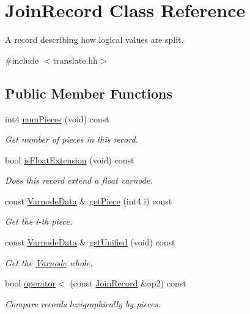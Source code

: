 \hypertarget{class_join_record}{}\section{Join\+Record Class Reference}
\label{class_join_record}


A record describing how logical values are split.  




{\ttfamily \#include $<$translate.\+hh$>$}

\subsection*{Public Member Functions}
\begin{DoxyCompactItemize}
\item 
int4 \mbox{\hyperlink{class_join_record_a18d9eb13c87a49511865fab244aa69f5}{num\+Pieces}} (void) const
\begin{DoxyCompactList}\small\item\em Get number of pieces in this record. \end{DoxyCompactList}\item 
bool \mbox{\hyperlink{class_join_record_a0a9314d1dd21efb75d8851aa05c387c4}{is\+Float\+Extension}} (void) const
\begin{DoxyCompactList}\small\item\em Does this record extend a float varnode. \end{DoxyCompactList}\item 
const \mbox{\hyperlink{struct_varnode_data}{Varnode\+Data}} \& \mbox{\hyperlink{class_join_record_a5d3feebaadef123349cda1564717b9d7}{get\+Piece}} (int4 i) const
\begin{DoxyCompactList}\small\item\em Get the i-\/th piece. \end{DoxyCompactList}\item 
const \mbox{\hyperlink{struct_varnode_data}{Varnode\+Data}} \& \mbox{\hyperlink{class_join_record_a71e39715b107db55fa5c737457877b3a}{get\+Unified}} (void) const
\begin{DoxyCompactList}\small\item\em Get the \mbox{\hyperlink{class_varnode}{Varnode}} whole. \end{DoxyCompactList}\item 
bool \mbox{\hyperlink{class_join_record_a2e6ea7f4592e991ee9c7e72b9c99307d}{operator$<$}} (const \mbox{\hyperlink{class_join_record}{Join\+Record}} \&op2) const
\begin{DoxyCompactList}\small\item\em Compare records lexigraphically by pieces. \end{DoxyCompactList}\end{DoxyCompactItemize}
